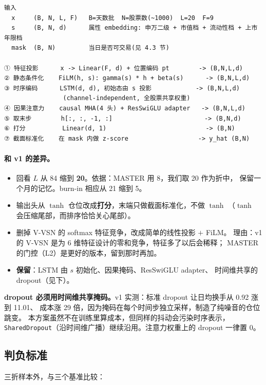 \documentclass[11pt, a4paper]{ctexart}
\newcommand{\file}[1]{\texttt{\small #1}}
\begin{document}
\begin{lstlisting}
输入
  x     (B, N, L, F)   B=天数批  N=股票数(~1000)  L=20  F=9
  s     (B, N, d)      属性 embedding: 申万二级 + 市值档 + 流动性档 + 上市年限档
  mask  (B, N)         当日是否可交易(见 4.3 节)

① 特征投影      x -> Linear(F, d) + 位置编码 pt        -> (B,N,L,d)
② 静态条件化    FiLM(h, s): gamma(s) * h + beta(s)      -> (B,N,L,d)
③ 时序编码      LSTM(d, d), 初始态由 s 投影            -> (B,N,L,d)
                (channel-independent, 全股票共享权重)
④ 因果注意力    causal MHA(4 头) + ResSwiGLU adapter   -> (B,N,L,d)
⑤ 取末步        h[:, :, -1, :]                         -> (B,N,d)
⑥ 打分          Linear(d, 1)                           -> (B,N)
⑦ 截面标准化    在 mask 内做 z-score                   -> y_hat (B,N)
\end{lstlisting}

\paragraph{和 v1 的差异。}
\begin{itemize}
  \item 回看 $L$ 从 84 缩到 \textbf{20}。依据：MASTER 用 8，我们取 20 作为折中，
        保留一个月的记忆。burn-in 相应从 21 缩到 5。
  \item 输出头从 $\tanh$ 仓位改成\textbf{打分}，末端只做截面标准化，不做 $\tanh$
        （$\tanh$ 会压缩尾部，而排序恰恰关心尾部）。
  \item 删掉 V-VSN 的 softmax 特征竞争，改成简单的线性投影 $+$ FiLM。
        理由：v1 的 V-VSN 是为 6 维特征设计的零和竞争，特征多了以后会稀释；
        MASTER 的门控（L2）是更好的版本，留到那时再加。
  \item \textbf{保留}：LSTM 由 $s$ 初始化、因果掩码、ResSwiGLU adapter、
        时间维共享的 dropout（见下）。
\end{itemize}

\begin{warnbox}
\textbf{dropout 必须用时间维共享掩码。}v1 实测：标准 dropout 让日均换手从 0.92 涨到 11.01、
成本涨 29 倍，因为掩码在每个时间步独立采样，制造了纯噪音的仓位跳变。
本方案虽然不在训练里算成本，但同样的抖动会污染时序表示，
\file{SharedDropout}（沿时间维广播）继续沿用。注意力权重上的 dropout 一律置 0。
\end{warnbox}

\subsection{判负标准}
三折样本外，与三个基准比较：
\end{document}
